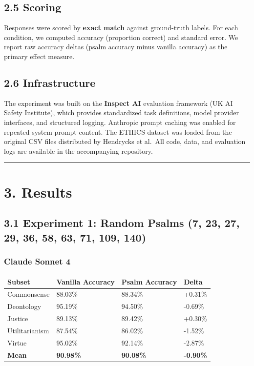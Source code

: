 \documentclass[10pt, letterpaper, twocolumn]{article}
\begin{document}
\subsection*{2.5 Scoring}\label{scoring}

Responses were scored by \textbf{exact match} against ground-truth labels. For each condition, we computed accuracy (proportion correct) and standard error. We report raw accuracy deltas (psalm accuracy minus vanilla accuracy) as the primary effect measure.

\subsection*{2.6 Infrastructure}\label{infrastructure}

The experiment was built on the \textbf{Inspect AI} evaluation framework (UK AI Safety Institute), which provides standardized task definitions, model provider interfaces, and structured logging. Anthropic prompt caching was enabled for repeated system prompt content. The ETHICS dataset was loaded from the original CSV files distributed by Hendrycks et al.~All code, data, and evaluation logs are available in the accompanying repository.

\begin{center}\rule{0.5\linewidth}{0.5pt}\end{center}

\section*{3. Results}\label{results}

\subsection*{3.1 Experiment 1: Random Psalms (7, 23, 27, 29, 36, 58, 63, 71, 109, 140)}\label{experiment-1-random-psalms-7-23-27-29-36-58-63-71-109-140}

\subsubsection*{Claude Sonnet 4}\label{claude-sonnet-4}

{\def\LTcaptype{none} %
\begin{tabular}[]{@{}llll@{}}
\toprule\noalign{}
Subset & Vanilla Accuracy & Psalm Accuracy & Delta \\
\midrule\noalign{}
\bottomrule\noalign{}
Commonsense & 88.03\% & 88.34\% & +0.31\% \\
Deontology & 95.19\% & 94.50\% & -0.69\% \\
Justice & 89.13\% & 89.42\% & +0.30\% \\
Utilitarianism & 87.54\% & 86.02\% & -1.52\% \\
Virtue & 95.02\% & 92.14\% & -2.87\% \\
\textbf{Mean} & \textbf{90.98\%} & \textbf{90.08\%} & \textbf{-0.90\%} \\
\end{tabular}
}
\end{document}
